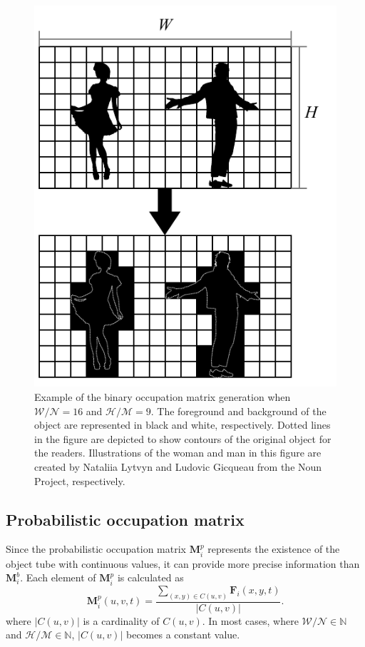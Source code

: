 \documentclass[11pt]{hyu_thesis}
\begin{document}
\begin{figure}
	\begin{center}
		\includegraphics[width=0.7\linewidth]{bin-occ.pdf}
	\end{center}
	\caption{Example of the binary occupation matrix generation when $\mathcal{W}/\mathcal{N}=16$ and $\mathcal{H}/\mathcal{M}=9$. The foreground and background of the object are represented in black and white, respectively. Dotted lines in the figure are depicted to show contours of the original object for the readers. Illustrations of the woman and man in this figure are created by Nataliia Lytvyn and Ludovic Gicqueau from the Noun Project, respectively.}
	\label{fig:bin_occ}
\end{figure}

\subsection{Probabilistic occupation matrix}
\label{sec:proposed:occ:prob}
Since the probabilistic occupation matrix $\textbf{M}_i^p$ represents the existence of the object tube with continuous values, it can provide more precise information than $\textbf{M}_i^b$. Each element of $\textbf{M}_i^p$ is calculated as
\begin{equation}
\label{eq:prob_occ}
\textbf{M}_i^p(u,v,t)= \frac{\sum_{(x,y) \in C(u,v)}\textbf{F}_i(x,y,t)}{|C(u,v)|}.
\end{equation}
where $|C(u,v)|$ is a cardinality of $C(u,v)$. In most cases, where $\mathcal{W}/\mathcal{N} \in \mathbb{N}$ and $\mathcal{H}/\mathcal{M} \in \mathbb{N}$, $|C(u,v)|$ becomes a constant value.
\end{document}
